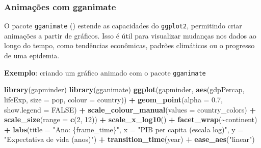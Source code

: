 \documentclass[
]{book}
\newenvironment{Shaded}{\begin{snugshade}}{\end{snugshade}}
\newcommand{\AttributeTok}[1]{\textcolor[rgb]{0.13,0.29,0.53}{#1}}
\newcommand{\ConstantTok}[1]{\textcolor[rgb]{0.56,0.35,0.01}{#1}}
\newcommand{\DecValTok}[1]{\textcolor[rgb]{0.00,0.00,0.81}{#1}}
\newcommand{\FloatTok}[1]{\textcolor[rgb]{0.00,0.00,0.81}{#1}}
\newcommand{\FunctionTok}[1]{\textcolor[rgb]{0.13,0.29,0.53}{\textbf{#1}}}
\newcommand{\NormalTok}[1]{#1}
\newcommand{\SpecialCharTok}[1]{\textcolor[rgb]{0.81,0.36,0.00}{\textbf{#1}}}
\newcommand{\StringTok}[1]{\textcolor[rgb]{0.31,0.60,0.02}{#1}}
\begin{document}
\subsubsection{Animações com gganimate}\label{animauxe7uxf5es-com-gganimate}

O pacote \texttt{gganimate} () estende as capacidades do \texttt{ggplot2}, permitindo criar animações a partir de gráficos. Isso é útil para visualizar mudanças nos dados ao longo do tempo, como tendências econômicas, padrões climáticos ou o progresso de uma epidemia.

\textbf{Exemplo}: criando um gráfico animado com o pacote \texttt{gganimate}

\begin{Shaded}
\begin{Highlighting}[]
\FunctionTok{library}\NormalTok{(gapminder)}
\FunctionTok{library}\NormalTok{(gganimate)}
\FunctionTok{ggplot}\NormalTok{(gapminder, }\FunctionTok{aes}\NormalTok{(gdpPercap, lifeExp, }\AttributeTok{size =}\NormalTok{ pop, }\AttributeTok{colour =}\NormalTok{ country)) }\SpecialCharTok{+}
  \FunctionTok{geom\_point}\NormalTok{(}\AttributeTok{alpha =} \FloatTok{0.7}\NormalTok{, }\AttributeTok{show.legend =} \ConstantTok{FALSE}\NormalTok{) }\SpecialCharTok{+}
  \FunctionTok{scale\_colour\_manual}\NormalTok{(}\AttributeTok{values =}\NormalTok{ country\_colors) }\SpecialCharTok{+}
  \FunctionTok{scale\_size}\NormalTok{(}\AttributeTok{range =} \FunctionTok{c}\NormalTok{(}\DecValTok{2}\NormalTok{, }\DecValTok{12}\NormalTok{)) }\SpecialCharTok{+}
  \FunctionTok{scale\_x\_log10}\NormalTok{() }\SpecialCharTok{+}
  \FunctionTok{facet\_wrap}\NormalTok{(}\SpecialCharTok{\textasciitilde{}}\NormalTok{continent) }\SpecialCharTok{+}
  \FunctionTok{labs}\NormalTok{(}\AttributeTok{title =} \StringTok{"Ano: \{frame\_time\}"}\NormalTok{, }\AttributeTok{x =} \StringTok{"PIB per capita (escala log)"}\NormalTok{,}
       \AttributeTok{y =} \StringTok{"Expectativa de vida (anos)"}\NormalTok{) }\SpecialCharTok{+}
  \FunctionTok{transition\_time}\NormalTok{(year) }\SpecialCharTok{+}
  \FunctionTok{ease\_aes}\NormalTok{(}\StringTok{"linear"}\NormalTok{)}
\end{Highlighting}
\end{Shaded}
\end{document}

